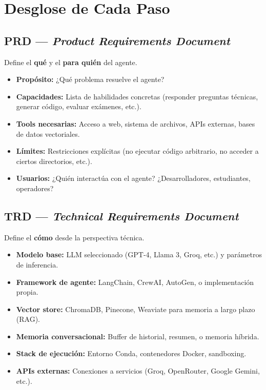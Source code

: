 \documentclass[12pt,a4paper]{article}
\begin{document}
\section{Desglose de Cada Paso}

\subsection{PRD --- \textit{Product Requirements Document}}

Define el \textbf{qué} y el \textbf{para quién} del agente.

\begin{itemize}[leftmargin=*]
  \item \textbf{Propósito:} ¿Qué problema resuelve el agente?
  \item \textbf{Capacidades:} Lista de habilidades concretas (responder preguntas técnicas, generar código, evaluar exámenes, etc.).
  \item \textbf{Tools necesarias:} Acceso a web, sistema de archivos, APIs externas, bases de datos vectoriales.
  \item \textbf{Límites:} Restricciones explícitas (no ejecutar código arbitrario, no acceder a ciertos directorios, etc.).
  \item \textbf{Usuarios:} ¿Quién interactúa con el agente? ¿Desarrolladores, estudiantes, operadores?
\end{itemize}

\subsection{TRD --- \textit{Technical Requirements Document}}

Define el \textbf{cómo} desde la perspectiva técnica.

\begin{itemize}[leftmargin=*]
  \item \textbf{Modelo base:} LLM seleccionado (GPT-4, Llama 3, Groq, etc.) y parámetros de inferencia.
  \item \textbf{Framework de agente:} LangChain, CrewAI, AutoGen, o implementación propia.
  \item \textbf{Vector store:} ChromaDB, Pinecone, Weaviate para memoria a largo plazo (RAG).
  \item \textbf{Memoria conversacional:} Buffer de historial, resumen, o memoria híbrida.
  \item \textbf{Stack de ejecución:} Entorno Conda, contenedores Docker, sandboxing.
  \item \textbf{APIs externas:} Conexiones a servicios (Groq, OpenRouter, Google Gemini, etc.).
\end{itemize}
\end{document}
